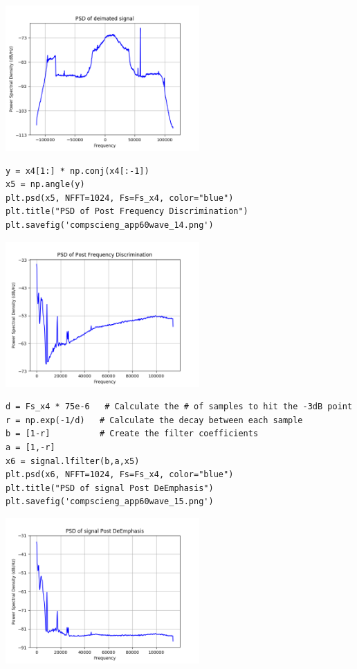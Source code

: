 \documentclass[12pt,fleqn]{article}\usepackage{../../common}
\begin{document}
\includegraphics[width=20em]{compscieng_app60wave_13.png}

\begin{verbatim}
y = x4[1:] * np.conj(x4[:-1])
x5 = np.angle(y)
plt.psd(x5, NFFT=1024, Fs=Fs_x4, color="blue")
plt.title("PSD of Post Frequency Discrimination")
plt.savefig('compscieng_app60wave_14.png')
\end{verbatim}

\includegraphics[width=20em]{compscieng_app60wave_14.png}

\begin{verbatim}
d = Fs_x4 * 75e-6   # Calculate the # of samples to hit the -3dB point
r = np.exp(-1/d)   # Calculate the decay between each sample
b = [1-r]          # Create the filter coefficients
a = [1,-r]
x6 = signal.lfilter(b,a,x5)
plt.psd(x6, NFFT=1024, Fs=Fs_x4, color="blue")
plt.title("PSD of signal Post DeEmphasis")
plt.savefig('compscieng_app60wave_15.png')
\end{verbatim}

\includegraphics[width=20em]{compscieng_app60wave_15.png}
\end{document}
